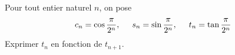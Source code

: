 Pour tout entier naturel $n$, on pose
\begin{displaymath}
  c_n = \cos\frac{\pi}{2^n},\hspace{0.5cm} s_n = \sin\frac{\pi}{2^n},\hspace{0.5cm} t_n = \tan\frac{\pi}{2^n}
\end{displaymath}
Exprimer $t_{n}$ en fonction de $t_{n+1}$.
\bigskip \bigskip